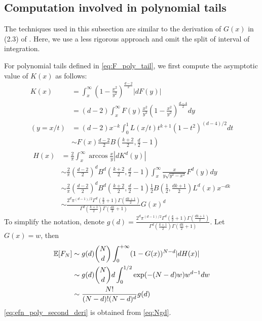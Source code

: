 \documentclass{aptpub}
\def\E{\mathbb{E}}
\begin{document}
\subsection{Computation involved in polynomial tails}
The techniques used in this subsection are similar to the derivation of $G(x)$
in (2.3) of \cite{carnal1970konvexe}. Here, we use a less rigorous approach and omit the split
of interval of integration.

For polynomial tails defined in \eqref{eq:F_poly_tail},
we first compute the asymptotic value of $K(x)$
as follows:
\begin{align*}
     K(x) & = \int_x^{\infty} (1-\frac{x^2}{y^2})^{\frac{d-2}{2}} |dF(y)| \\
     &= (d-2)\int_x^{\infty} F(y)\frac{x^2}{y^3} (1-\frac{x^2}{y^2})^{\frac{d-4}{2}} dy\\
     (y=x/t) &= (d-2)x^{-k} \int_0^{1} L(x/t) t^{k+1} (1-t^2)^{(d-4)/2}dt \\
     & \sim F(x) \frac{d-2}{2} B\left(\frac{k+2}{2}, \frac{d}{2}-1\right) 
\end{align*}
\begin{align*}
     H(x) &= \frac{2}{\pi}
     \int_x^{\infty} \arccos\frac{x}{y}
     |d K^d(y)| \\
     &\sim \frac{2}{\pi}\left(\frac{d-2}{2}\right)^d
     B^d\left(\frac{k+2}{2}, \frac{d}{2}-1\right)
     \int_x^{\infty} \frac{x}{y \sqrt{y^2-x^2}} F^d(y) dy \\
     &\sim \frac{2}{\pi}\left(\frac{d-2}{2}\right)^d
     B^d\left(\frac{k+2}{2}, \frac{d}{2}-1\right) \frac{1}{2}
     B\left(\frac{1}{2}, \frac{dk+1}{2}\right)L^d(x) x^{-dk} \\
     &\sim \frac{2^d \pi^{(d-1)/2}\Gamma^d(\frac{k}{2}+1)
     \Gamma(\frac{dk+1}{2})}{
         \Gamma^d(\frac{k+1}{2}) \Gamma(\frac{dk}{2}+1)} G(x)^d 
\end{align*}
To simplify the notation, denote $g(d)=\frac{2^d \pi^{(d-1)/2}\Gamma^d(\frac{k}{2}+1)
\Gamma(\frac{dk+1}{2})}{
    \Gamma^d(\frac{k+1}{2}) \Gamma(\frac{dk}{2}+1)}$.
Let $G(x)=w$, then
\begin{align}
     \E[F_N] &\sim g(d)\binom{N}{d} \int_0^{+\infty} 
      (1-G(x))^{N-d} |dH(x)| \notag \\
      &\sim g(d)\binom{N}{d}d\int_0^{1/2} \exp(-(N-d)w)w^{d-1}dw
      \notag \\
      &\sim \frac{N!}{(N-d)! (N-d)^d}g(d) \label{eq:Ngd}
\end{align}
\eqref{eq:efn_poly_second_deri} is obtained from \eqref{eq:Ngd}.
\end{document}
